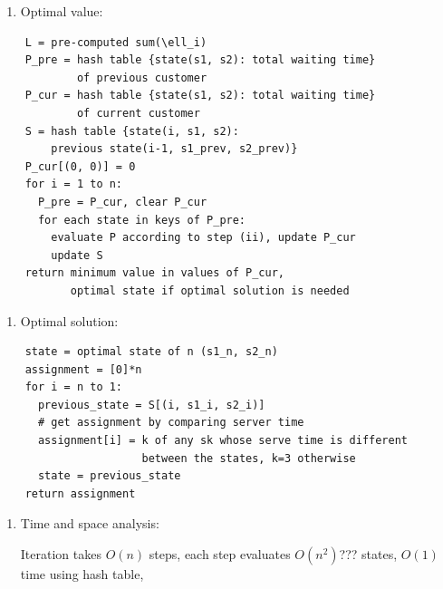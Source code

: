 \documentclass[11pt]{article}
\begin{document}
\begin{description}
\begin{enumerate}
  \item[(iv)] Optimal value:
\end{enumerate}
\begin{verbatim}
    L = pre-computed sum(\ell_i)
    P_pre = hash table {state(s1, s2): total waiting time} 
            of previous customer
    P_cur = hash table {state(s1, s2): total waiting time} 
            of current customer
    S = hash table {state(i, s1, s2): 
        previous state(i-1, s1_prev, s2_prev)}
    P_cur[(0, 0)] = 0
    for i = 1 to n:
      P_pre = P_cur, clear P_cur
      for each state in keys of P_pre:
        evaluate P according to step (ii), update P_cur
        update S
    return minimum value in values of P_cur, 
           optimal state if optimal solution is needed
\end{verbatim}
\begin{enumerate}
  \item[(v)] Optimal solution:
\end{enumerate}
\begin{verbatim}
    state = optimal state of n (s1_n, s2_n)
    assignment = [0]*n
    for i = n to 1:
      previous_state = S[(i, s1_i, s2_i)]
      # get assignment by comparing server time
      assignment[i] = k of any sk whose serve time is different 
                      between the states, k=3 otherwise
      state = previous_state
    return assignment
\end{verbatim}
\begin{enumerate}
  \item[(vi)] Time and space analysis:
  
  Iteration takes $O(n)$ steps, each step evaluates $O(n^2)$??? states, $O(1)$ time using
  hash table, 
\end{enumerate}

\end{description}
\end{document}
